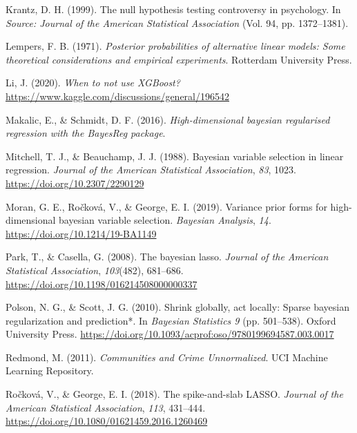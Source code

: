 \documentclass[
  11pt,
]{article}
\newlength{\cslhangindent}
\newlength{\cslentryspacingunit} %
\newenvironment{CSLReferences}[2] %
 {%
  \setlength{\parindent}{0pt}
  \ifodd #1
  \let\oldpar\par
  \def\par{\hangindent=\cslhangindent\oldpar}
  \fi
  \setlength{\parskip}{#2\cslentryspacingunit}
 }%
 {}
\begin{document}
\begin{CSLReferences}{1}{0}
\leavevmode{}%
Krantz, D. H. (1999). The null hypothesis testing controversy in
psychology. In \emph{Source: Journal of the American Statistical
Association} (Vol. 94, pp. 1372--1381).

\leavevmode{}%
Lempers, F. B. (1971). \emph{Posterior probabilities of alternative
linear models: Some theoretical considerations and empirical
experiments}. Rotterdam University Press.

\leavevmode{}%
Li, J. (2020). \emph{When to not use XGBoost?}
\url{https://www.kaggle.com/discussions/general/196542}

\leavevmode{}%
Makalic, E., \& Schmidt, D. F. (2016). \emph{High-dimensional bayesian
regularised regression with the BayesReg package}.

\leavevmode{}%
Mitchell, T. J., \& Beauchamp, J. J. (1988). Bayesian variable selection
in linear regression. \emph{Journal of the American Statistical
Association}, \emph{83}, 1023. \url{https://doi.org/10.2307/2290129}

\leavevmode{}%
Moran, G. E., Ročková, V., \& George, E. I. (2019). Variance prior forms
for high-dimensional bayesian variable selection. \emph{Bayesian
Analysis}, \emph{14}. \url{https://doi.org/10.1214/19-BA1149}

\leavevmode{}%
Park, T., \& Casella, G. (2008). The bayesian lasso. \emph{Journal of
the American Statistical Association}, \emph{103}(482), 681--686.
\url{https://doi.org/10.1198/016214508000000337}

\leavevmode{}%
Polson, N. G., \& Scott, J. G. (2010). Shrink globally, act locally:
Sparse bayesian regularization and prediction*. In \emph{Bayesian
Statistics 9} (pp. 501--538). Oxford University Press.
\url{https://doi.org/10.1093/acprof:oso/9780199694587.003.0017}

\leavevmode{}%
Redmond, M. (2011). \emph{{Communities and Crime Unnormalized}}. UCI
Machine Learning Repository.

\leavevmode{}%
Ročková, V., \& George, E. I. (2018). The spike-and-slab LASSO.
\emph{Journal of the American Statistical Association}, \emph{113},
431--444. \url{https://doi.org/10.1080/01621459.2016.1260469}


\end{CSLReferences}
\end{document}
